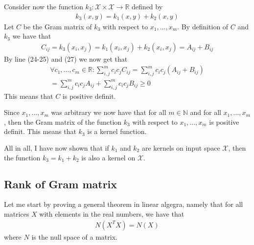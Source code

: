 Consider now the function $k_3:\mathcal{X}\times \mathcal{X} \to \mathbb{R}$ defined by
\begin{align}
k_3(x,y) = k_1(x,y) + k_2(x,y)
\end{align}
Let $C$ be the Gram matrix of $k_3$ with respect to $x_1,...,x_m$. By definition of $C$ and $k_3$ we have that
\begin{align}
C_{ij} = k_3(x_i,x_j) = k_1(x_i,x_j) + k_2(x_i,x_j) = A_{ij} + B_{ij}
\end{align} 
By line (24-25) and (27) we now get that
\begin{align}
\forall c_1,...,c_m \in \mathbb{R}: \sum_{i,j}^m c_i c_j C_{ij} = \sum_{i,j}^m c_i c_j (A_{ij} + B_{ij}) \\
= \sum_{i,j}^m c_i c_jA_{ij} + \sum_{i,j}^m c_i c_jB_{ij} \geq 0
\end{align}
This means that $C$ is positive definit. 

Since $x_1,...,x_m$ was arbitrary we now have that for all $m \in \mathbb{N}$ and for all $x_1,...,x_m$, then the Gram matrix of the function $k_3$ with respect to $x_1,...,x_m$ is positive definit. This means that $k_3$ is a kernel function.

All in all, I have now shown that if $k_1$ and $k_2$ are kernels on input space $\mathcal{X}$, then the function $k_3 = k_1 + k_2$ is also a kernel on $\mathcal{X}$.

\subsection{Rank of Gram matrix}

Let me start by proving a general theorem in linear algegra, namely that for all matrices $X$ with elements in the real numbers, we have that
\begin{align}
N(X^TX) = N(X) 
\end{align}
where $N$ is the null space of a matrix. 

